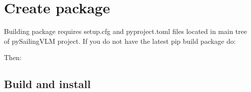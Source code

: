 \documentclass[a4paper,12pt,english]{jupyterBook}
\begin{document}
\begin{sphinxVerbatim}[commandchars=\\\{\}]
    
\end{sphinxVerbatim}


\chapter{Create package}
\label{\detokenize{chapters/start/installation:create-package}}
\sphinxAtStartPar
Building package requires setup.cfg and pyproject.toml files located in main tree of pySailingVLM project. If you do not have the latest pip build package do:

\begin{sphinxVerbatim}[commandchars=\\\{\}]
   
\end{sphinxVerbatim}

\sphinxAtStartPar
Then:

\begin{sphinxVerbatim}[commandchars=\\\{\}]
  
\end{sphinxVerbatim}


\section{Build and install}
\label{\detokenize{chapters/start/installation:build-and-install}}
\begin{sphinxVerbatim}[commandchars=\\\{\}]
  
\end{sphinxVerbatim}

\begin{sphinxVerbatim}[commandchars=\\\{\}]
  
\end{sphinxVerbatim}







\renewcommand{\indexname}{Index}
\printindex
\end{document}
